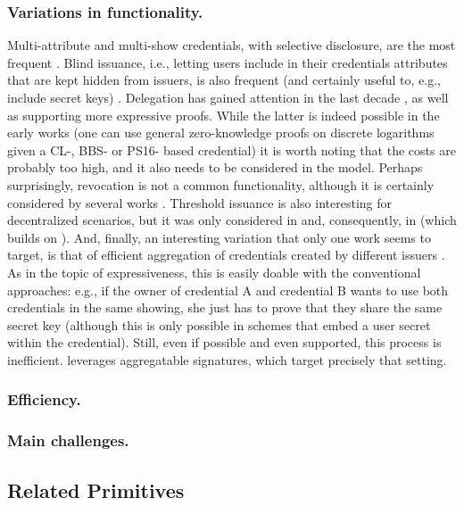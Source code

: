 \subsubsection{Variations in functionality.}
%
Multi-attribute and multi-show credentials, with selective disclosure, are
the most frequent \needcite.  Blind issuance, i.e., letting users include in
their credentials attributes that are kept hidden from issuers, is also frequent
(and certainly useful to, e.g., include secret keys) \needcite. Delegation has
gained attention in the last decade \needcite, as well as supporting more
expressive proofs. While the latter is indeed possible in the early works
(one can use general zero-knowledge proofs on discrete logarithms given a
CL-, BBS- or PS16- based credential) it is worth noting that the costs are
probably too high, and it also needs to be considered in the model.
%
Perhaps surprisingly, revocation is not a common functionality, although it is
certainly considered by several works \needcite.
%
Threshold issuance is also interesting for decentralized scenarios, but it
was only considered in \cite{sms+19} and, consequently, in \cite{halp20}
(which builds on \cite{sms+19}).
%
And, finally, an interesting variation that only one work seems to target,
is that of efficient aggregation of credentials created by different issuers
\cite{cl11}. As in the topic of expressiveness, this is easily doable with the
conventional approaches: e.g., if the owner of credential A and credential B
wants to use both credentials in the same showing, she just has to prove that
they share the same secret key (although this is only possible in schemes that
embed a user secret within the credential). Still, even if possible and even
supported, this process is inefficient. \cite{cl11} leverages aggregatable
signatures, which target precisely that setting.

\subsubsection{Efficiency.}
%

\subsubsection{Main challenges.}
%

\subsection{Related Primitives}
\label{ssec:acrelated}

